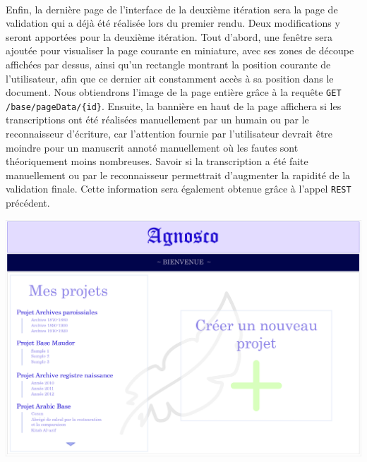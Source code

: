 \paragraph{}
Enfin, la dernière page de l’interface de la deuxième itération sera la page de validation qui a déjà été réalisée lors du premier rendu. Deux modifications y seront apportées pour la deuxième itération.
\newline{}
Tout d'abord, une fenêtre sera ajoutée pour visualiser la page courante en miniature, avec ses zones de découpe affichées par dessus, ainsi qu’un rectangle montrant la position courante de l’utilisateur, afin que ce dernier ait constamment accès à sa position dans le document. Nous obtiendrons l'image de la page entière grâce à la requête \texttt{GET} \texttt{/base/pageData/\{id\}}.
\newline{}
Ensuite, la bannière en haut de la page affichera si les transcriptions ont été réalisées manuellement par un humain ou par le reconnaisseur d'écriture, car l'attention fournie par l'utilisateur devrait être moindre pour un manuscrit annoté manuellement où les fautes sont théoriquement moins nombreuses. Savoir si la transcription a été faite manuellement ou par le reconnaisseur permettrait d'augmenter la rapidité de la validation finale. Cette information sera également obtenue grâce à l'appel \texttt{REST} précédent.



\newpage{}
\begin{mdframed}[frametitle={Figure 1 : Maquette de la page d'accueil de l'IHM}, innerbottommargin=10]
\begin{center}
\includegraphics[scale=0.04]{assets/maquetteIHMaccueil.jpg}
\end{center}
\end{mdframed}



